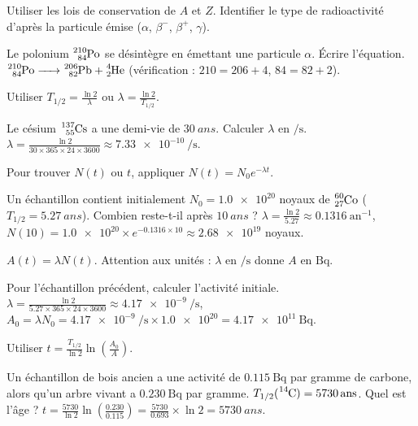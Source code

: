 Utiliser les lois de conservation de $A$ et $Z$. Identifier le type de radioactivité d'après la particule émise ($\alpha$, $\beta^-$, $\beta^+$, $\gamma$).

\begin{exemple}
Le polonium $\ce{^{210}_{84}Po}$ se désintègre en émettant une particule $\alpha$. Écrire l'équation.
$\ce{^{210}_{84}Po -> ^{206}_{82}Pb + ^{4}_{2}He}$ (vérification : $210 = 206+4$, $84 = 82+2$).
\end{exemple}

Utiliser $T_{1/2} = \frac{\ln 2}{\lambda}$ ou $\lambda = \frac{\ln 2}{T_{1/2}}$.

\begin{exemple}
Le césium $\ce{^{137}_{55}Cs}$ a une demi-vie de $\SI{30}{ans}$. Calculer $\lambda$ en $\si{\per\second}$.
$\lambda = \frac{\ln 2}{30 \times 365 \times 24 \times 3600} \approx \SI{7.33e-10}{\per\second}$.
\end{exemple}

Pour trouver $N(t)$ ou $t$, appliquer $N(t) = N_0 e^{-\lambda t}$.

\begin{exemple}
Un échantillon contient initialement $N_0 = \num{1.0e20}$ noyaux de $\ce{^{60}_{27}Co}$ ($T_{1/2} = \SI{5.27}{ans}$). Combien reste-t-il après $\SI{10}{ans}$ ?
$\lambda = \frac{\ln 2}{5.27} \approx \num{0.1316}~\mathrm{an}^{-1}$, $N(10) = \num{1.0e20} \times e^{-0.1316 \times 10} \approx \num{2.68e19}$ noyaux.
\end{exemple}

$A(t) = \lambda N(t)$. Attention aux unités : $\lambda$ en $\si{\per\second}$ donne $A$ en $\si{\becquerel}$.

\begin{exemple}
Pour l'échantillon précédent, calculer l'activité initiale.
$\lambda = \frac{\ln 2}{5.27 \times 365 \times 24 \times 3600} \approx \SI{4.17e-9}{\per\second}$, $A_0 = \lambda N_0 = \SI{4.17e-9}{\per\second} \times \num{1.0e20} = \SI{4.17e11}{\becquerel}$.
\end{exemple}

Utiliser $t = \frac{T_{1/2}}{\ln 2} \ln\left(\frac{A_0}{A}\right)$.

\begin{exemple}
Un échantillon de bois ancien a une activité de $\SI{0.115}{\becquerel}$ par gramme de carbone, alors qu'un arbre vivant a $\SI{0.230}{\becquerel}$ par gramme. $T_{1/2}(\ce{^{14}C}) = \SI{5730}{ans}$. Quel est l'âge ?
$t = \frac{5730}{\ln 2} \ln\left(\frac{0.230}{0.115}\right) = \frac{5730}{0.693} \times \ln 2 = \SI{5730}{ans}$.
\end{exemple}

